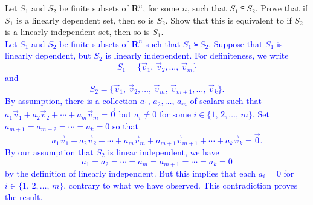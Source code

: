 \documentclass[a4paper,11pt]{article}
\newcommand{\R}{\mathbf{R}}
\newcommand{\BB}[1]{\textcolor{blue}{#1}}
\begin{document}
 Let $S_1$ and $S_2$ be finite subsets of $\R^n$,
for some $n$, such that $S_1 \subseteqq S_2$. Prove that if $S_1$ is a linearly
dependent set, then so is $S_2$. Show that this is equivalent to if $S_2$ is a
linearly independent set, then so is $S_1$. \\

\BB{Let $S_1$ and $S_2$ be finite subsets of $\R^n$ such that $S_1 \subseteqq
  S_2$. Suppose that $S_1$ is linearly dependent, but $S_2$ is linearly
  independent. For definiteness, we write
  \[
    S_1 = \{\vec v_1,\,\vec v_2,\dots,\,\vec v_m\}
  \]
  and
  \[
    S_2 = \{\vec v_1,\,\vec v_2,\dots,\,\vec v_m,\,\vec v_{m+1},\dots,\,\vec v_k\}.
  \] By assumption, there is a collection $a_1,\,a_2,\dots,\,a_m$ of scalars such
  that $a_1\vec v_1 + a_2\vec v_2 + \cdots + a_m\vec v_m=\vec 0$ but $a_i \neq 0$
  for some $i \in \{1,\,2,\dots,\,m\}$. Set $a_{m+1}=a_{m+2}=\cdots=a_k=0$ so that
  \[
    a_1\vec v_1 + a_2\vec v_2 + \cdots + a_m\vec v_m + a_{m+1}\vec v_{m+1} + \cdots
    + a_k\vec v_k = \vec 0.
  \]
  By our assumption that $S_2$ is linear independent, we have
  \[
    a_1=a_2=\cdots=a_m=a_{m+1}=\cdots=a_k=0
  \]
  by the definition of linearly independent. But this implies that each $a_i=0$ for
  $i \in \{1,\,2,\dots,\,m\}$, contrary to what we have observed. This
  contradiction proves the result. \\}
\end{document}
